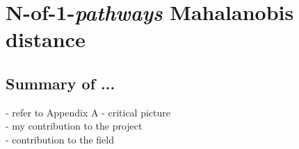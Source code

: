 \chapter{N-of-1-\emph{pathways} Mahalanobis distance} \label{Chap:md}


\section{Summary of ...} \label{sec:mdsummary}

- refer to Appendix A
- critical picture\\
- my contribution to the project\\
- contribution to the field\\

%
